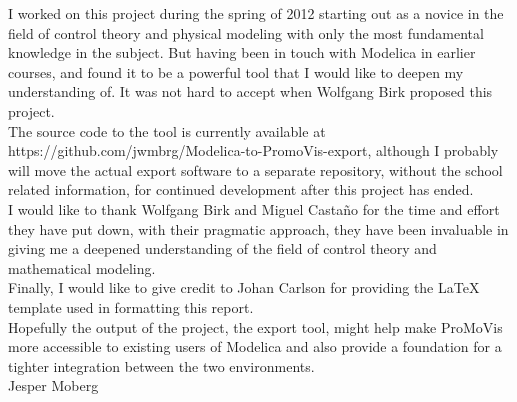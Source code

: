I worked on this project during the spring of 2012 starting out as a novice in the field of control theory and physical modeling with only the most fundamental knowledge in the subject. But having been in touch with Modelica in earlier courses, and found it to be a powerful tool that I would like to deepen my understanding of. It was not hard to accept when Wolfgang Birk proposed this project.\\\newline The source code to the tool is currently available at https://github.com/jwmbrg/Modelica-to-PromoVis-export, although I probably will move the actual export software to a separate repository, without the school related information, for continued development after this project has ended.\\\newline I would like to thank Wolfgang Birk and Miguel Casta{\~{n}}o for the time and effort they have put down,  with their pragmatic approach, they have been invaluable in giving me a deepened understanding of the field of control theory and mathematical modeling.\\\newline Finally, I would like to give credit to Johan Carlson for providing the \LaTeX{} template used in formatting this report. \\\newline Hopefully the output of the project, the export tool, might help make ProMoVis more accessible to existing users of Modelica and also provide a foundation for a tighter integration between the two environments.\\\newline
\vspace*{2cm}%
\hfill Jesper Moberg
